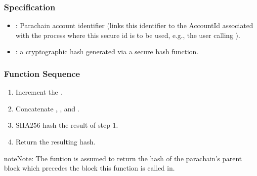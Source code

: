 \documentclass[a4paper,10pt,english]{sphinxmanual}
\begin{document}
\subsubsection{Specification}
\label{\detokenize{spec/security:specification}}


\begin{itemize}
\item {} 
: Parachain account identifier (links this identifier to the AccountId associated with the process where this secure id is to be used, e.g., the user calling {\hyperref[\detokenize{spec/issue:requestissue}]{}}).

\end{itemize}

\begin{itemize}
\item {} 
: a cryptographic hash generated via a secure hash function.

\end{itemize}


\subsubsection{Function Sequence}
\label{\detokenize{spec/security:function-sequence}}\begin{enumerate}
%
\item {} 
Increment the .

\item {} 
Concatenate , , and .

\item {} 
SHA256 hash the result of step 1.

\item {} 
Return the resulting hash.

\end{enumerate}

\begin{sphinxadmonition}{note}{Note:}
The funtion  is assumed to return the hash of the parachain’s parent block \sphinxhyphen{} which precedes the block this function is called in.
\end{sphinxadmonition}
\end{document}
